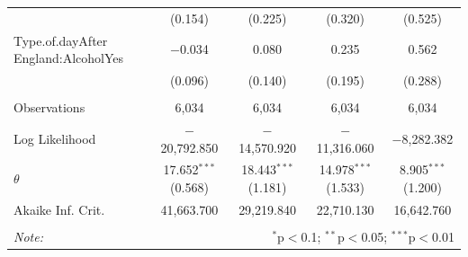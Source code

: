 \documentclass[12pt, letterpaper]{article}
\begin{document}
\begin{table}
{\begin{tabular}{@{\extracolsep{5pt}}lcccc}
  & (0.154) & (0.225) & (0.320) & (0.525) \\ 
  Type.of.dayAfter England:AlcoholYes & $-$0.034 & 0.080 & 0.235 & 0.562 \\ 
  & (0.096) & (0.140) & (0.195) & (0.288) \\ 
 \hline \\[-1.8ex] 
Observations & 6,034 & 6,034 & 6,034 & 6,034 \\ 
Log Likelihood & $-$20,792.850 & $-$14,570.920 & $-$11,316.060 & $-$8,282.382 \\ 
$\theta$ & 17.652$^{***}$  (0.568) & 18.443$^{***}$  (1.181) & 14.978$^{***}$  (1.533) & 8.905$^{***}$  (1.200) \\ 
Akaike Inf. Crit. & 41,663.700 & 29,219.840 & 22,710.130 & 16,642.760 \\ 
\hline 
\hline \\[-1.8ex] 
\textit{Note:}  & \multicolumn{4}{r}{$^{*}$p$<$0.1; $^{**}$p$<$0.05; $^{***}$p$<$0.01} \\ 
\end{tabular} }
\end{table}

\newpage
\end{document}
